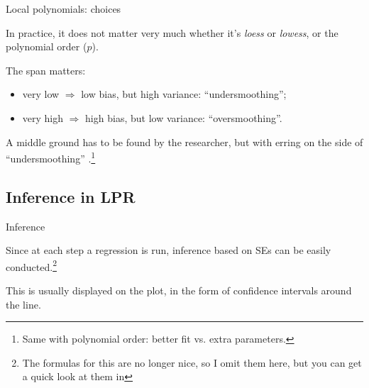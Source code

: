 \documentclass[12pt,english,pdf,xcolor=dvipsnames,aspectratio=169,handout]{beamer}\usepackage[]{graphicx}\usepackage[]{xcolor}
\begin{document}
\begin{frame}{Local polynomials: choices}

  In practice, it does not matter very much whether it's \textit{loess} or \textit{lowess}, or the polynomial order ($p$).\bigskip

  The span matters:

  \begin{itemize}
  \item very low $\Rightarrow$ low bias, but high variance: ``undersmoothing'';
  \item very high $\Rightarrow$ high bias, but low variance: ``oversmoothing''.
  \end{itemize}\bigskip

  A middle ground has to be found by the researcher, but with erring on the side of ``undersmoothing'' \cite[p.~34]{keele2008}.\footnote{Same with polynomial order: better fit vs. extra parameters.}
  
\end{frame}




\subsection{Inference in LPR}

\begin{frame}{Inference}

  Since at each step a regression is run, inference based on SEs can be easily conducted.\footnote{The formulas for this are no longer nice, so I omit them here, but you can get a quick look at them in }\bigskip

  This is usually displayed on the plot, in the form of confidence intervals around the line.
   
\end{frame}
\end{document}
